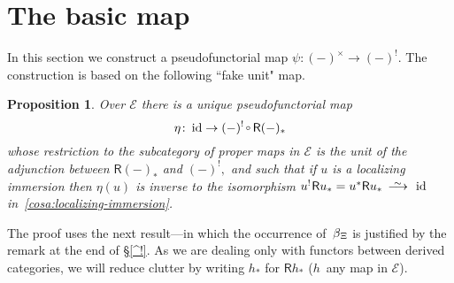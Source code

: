 \documentclass{compositio}
\theoremstyle{plain}
\newtheorem{prop}[thm]{Proposition}
\theoremstyle{definition}
\theoremstyle{remark}
\numberwithin{equation}{thm}
\begin{document}
\section{The basic map}\label{basic map}
In this section we construct a pseudofunctorial map $\psi\colon(-)^\times\to (-)^!$. The construction is based on the following  ``fake unit" map. 

\pagebreak

\begin{prop} 
\label{fake unit}
Over\/ ${\mathscr{E}}$ there is a unique pseudofunctorial map 
\[
\eta\colon\operatorname{id} \to (-)^!{{{\mkern1mu}{\mkern1mu}{\vbox to 0pt{\vskip-1 ex\hbox{$\scriptstyle {\scriptstyle}{\circ}$}\vss}}\,}}{\mathsf R}(-)_*
\] 
whose restriction to the subcategory of proper maps in\/ ${\mathscr{E}}$ is the unit of the adjunction between\/ ${\mathsf R} (-)_*$ and\/ $(-)^!,$ and such that if\/ $u$ is a localizing immersion then\/ $\eta(u)$ is inverse to the isomorphism\/ $u^!{\mkern1mu}{\mathsf R} u_*= u^*{\mathsf R} u_*{{\mkern8mu\longrightarrow \mkern-25.5mu{}^\sim\mkern17mu}}\operatorname{id}$ in~\ref{cosa:localizing-immersion}.
\end{prop}

The proof uses the next result---in which the occurrence of~$\beta_{{\mkern1mu}\Xi}$ is justified by the remark at the end of \S\ref{^!}.  As we are dealing only with functors between derived categories, we will reduce clutter by writing $h_*$ for ${\mathsf R} h_*$
($h$~any map in ${\mathscr{E}}$).
\end{document}
